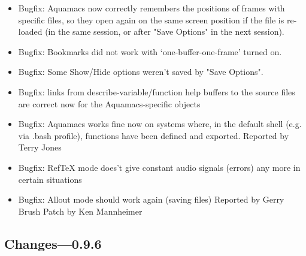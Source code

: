 \begin{itemize}
\item Bugfix: Aquamacs now correctly remembers the positions of frames
        with specific files, so they open again on the same screen
        position if the file is re-loaded (in the same session, or after
        "Save Options" in the next session).
\item Bugfix: Bookmarks did not work with `one-buffer-one-frame'
        turned on.
\item Bugfix: Some Show/Hide options weren't saved by
        "Save Options".
\item Bugfix: links from describe-variable/function help buffers to the
        source files are correct now for the Aquamacs-specific objects
\item Bugfix: Aquamacs works fine now on systems where, in the default
        shell (e.g. via .bash profile), functions have been defined and
        exported.
        Reported by Terry Jones
\item Bugfix: RefTeX mode does't give constant audio signals (errors)
        any more in certain situations
\item Bugfix: Allout mode should work again (saving files)
        Reported by Gerry Brush
        Patch by Ken Mannheimer


\end{itemize}

\subsection{Changes---0.9.6}


